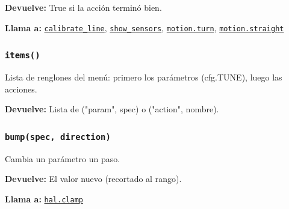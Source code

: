 \par{}\par\smallskip
\noindent\textbf{Devuelve:} True si la acción terminó bien.\par
\noindent\textbf{Llama a:} \hyperref[fn:settings:calibrate-line]{\texttt{calibrate\_\allowbreak{}line}}, \hyperref[fn:settings:show-sensors]{\texttt{show\_\allowbreak{}sensors}}, \hyperref[fn:motion:turn]{\texttt{motion.turn}}, \hyperref[fn:motion:straight]{\texttt{motion.straight}}\par

\subsubsection{\texttt{items()}}\label{fn:settings:items}
\noindent Lista de renglones del menú: primero los parámetros (cfg.TUNE), luego las acciones.

\noindent\textbf{Devuelve:} Lista de ("param", spec) o ("action", nombre).\par

\subsubsection{\texttt{bump(spec, direction)}}\label{fn:settings:bump}
\noindent Cambia un parámetro un paso.

\par{}\par\smallskip
\noindent\textbf{Devuelve:} El valor nuevo (recortado al rango).\par
\noindent\textbf{Llama a:} \hyperref[fn:hal:clamp]{\texttt{hal.clamp}}\par

